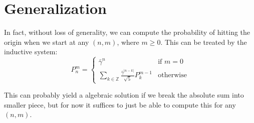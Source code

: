 \section{Generalization}

In fact, without loss of generality, we can compute the probability of hitting the origin when we start at any $(n,m)$, where $m \ge 0$. This can be treated by the inductive system:
$$
P^m_n = \begin{cases}
\bar\gamma^n & \text{if } m = 0 \\
\sum_{k \in \mathbb{Z}} \frac{\bar\gamma^{|n-k|}}{\sqrt{5}} P^{m-1}_k & \text{otherwise}
\end{cases}
$$

This can probably yield a algebraic solution if we break the absolute sum into smaller piece, but for now it suffices to just be able to compute this for any $(n,m)$.